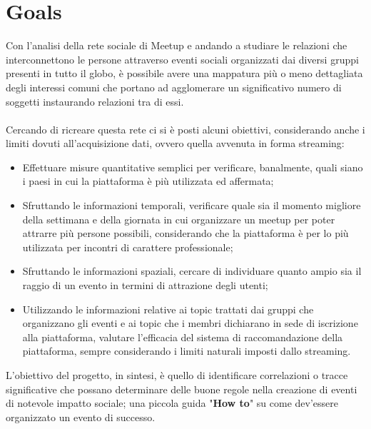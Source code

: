 \documentclass[fleqn,10pt]{SelfArx} %
\begin{document}
\section{Goals}
{\small
Con l'analisi della rete sociale di Meetup e andando a studiare le relazioni che interconnettono le persone attraverso eventi sociali organizzati dai diversi gruppi presenti in tutto il globo, è possibile avere una mappatura più o meno dettagliata degli interessi comuni che portano ad agglomerare un significativo numero di soggetti instaurando relazioni tra di essi. \\
\\
Cercando di ricreare questa rete ci si è posti alcuni obiettivi, considerando anche i limiti dovuti all'acquisizione dati, ovvero quella avvenuta in forma streaming:
\begin{itemize}
\item Effettuare misure quantitative semplici per verificare, banalmente, quali siano i paesi in cui la piattaforma è più utilizzata ed affermata;
\item Sfruttando le informazioni temporali, verificare quale sia il momento migliore della settimana e della giornata in cui organizzare un meetup per poter attrarre più persone possibili, considerando che la piattaforma è per lo più utilizzata per incontri di carattere professionale;
\item Sfruttando le informazioni spaziali, cercare di individuare quanto ampio sia il raggio di un evento in termini di attrazione degli utenti;
\item Utilizzando le informazioni relative ai topic trattati dai gruppi che organizzano gli eventi e ai topic che i membri dichiarano in sede di iscrizione alla piattaforma, valutare l'efficacia del sistema di raccomandazione della piattaforma, sempre considerando i limiti naturali imposti dallo streaming.
\end{itemize}
L'obiettivo del progetto, in sintesi, è quello di identificare correlazioni o tracce significative che possano determinare delle buone regole nella creazione di eventi di notevole impatto sociale; una piccola guida "\textbf{How to}" su come dev'essere organizzato un evento di successo.
}
\end{document}
